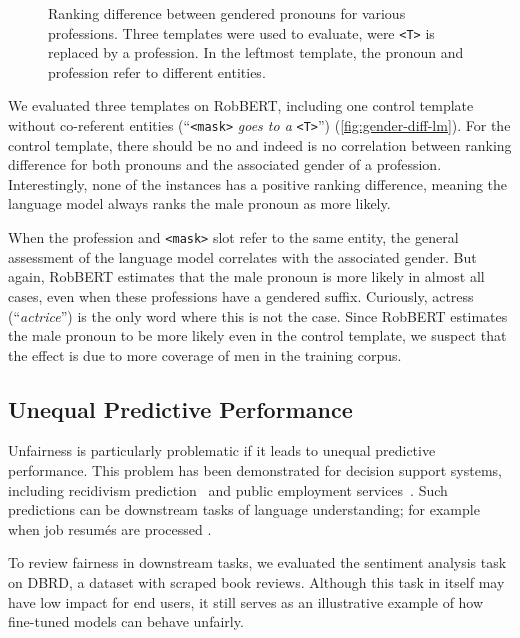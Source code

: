 \documentclass[11pt,a4paper]{article}
\begin{document}
\begin{figure}[tb]
    \caption{Ranking difference between gendered pronouns for various professions. Three templates were used to evaluate, were {\tt \textless T\textgreater} is replaced by a profession. In the leftmost template, the pronoun and profession refer to different entities.} 
    \label{fig:gender-diff-lm}
\end{figure}

We evaluated three templates on RobBERT, including one control template without co-referent entities (``{\tt \textless mask\textgreater} \emph{goes to a} {\tt \textless T\textgreater}'') (\autoref{fig:gender-diff-lm}).
For the control template, there should be no and indeed is no  correlation between ranking difference for both pronouns and the associated gender of a profession.
Interestingly, none of the instances has a positive ranking difference, meaning the language model always ranks the male pronoun as more likely.

When the profession and {\tt \textless mask\textgreater} slot refer to the same entity, the general assessment of the language model correlates with the associated gender.
But again, RobBERT estimates that the male pronoun is more likely in almost all cases, even when these professions have a gendered suffix.
Curiously, actress (``\emph{actrice}'') is the only word where this is not the case.
Since RobBERT estimates the male pronoun to be more likely even in the control template, we suspect that the effect is due to more coverage of men in the training corpus.


\subsection{Unequal Predictive Performance}
\label{ss:system-performance-bias}

Unfairness is particularly problematic if it leads to unequal predictive performance. This problem has been demonstrated for decision support systems, including recidivism prediction~\citep{angwinMachine2016} and public employment services~\citep{allhutterAlgorithmic2020}. Such predictions can be downstream tasks of language understanding; for example when job resumés are processed \citep{ van-hautte-etal-2020-leveraging}. 

To review fairness in downstream tasks, we evaluated the sentiment analysis task on DBRD, a dataset with scraped book reviews. 
Although this task in itself may have low impact for end users, it still serves as an illustrative example of how fine-tuned models can behave unfairly.
\end{document}
